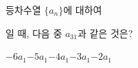 등차수열 $\{a_n\}$에 대하여 \par\smallskip{}\par\smallskip\noindent 일 때, 다음 중 $a_{31}$과 같은 것은?
\begin{choices32}{$-6a_1$}{$-5a_1$}{$-4a_1$}{$-3a_1$}{$-2a_1$}\end{choices32}
